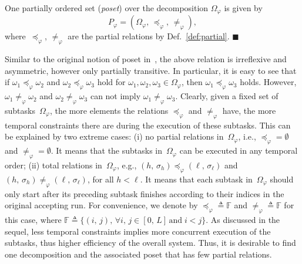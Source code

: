 \begin{definition}\label{def:poset}
One partially ordered set (\emph{poset}) over the decomposition $\Omega_{\varphi}$ is given by
\begin{equation}\label{eq:poset}
P_{\varphi} = (\Omega_{\varphi}, \, \preceq_{\varphi}, \, \neq_{\varphi}),
\end{equation}
where~$\preceq_{\varphi}$, $\neq_{\varphi}$ are the partial relations by
Def.~\ref{def:partial}.
\hfill $\blacksquare$
\end{definition}

Similar to the original notion of poset in~\cite{simovici2008mathematical},
the above relation is irreflexive and asymmetric,
however only partially transitive.
In particular, it is easy to see that
if $\omega_1\preceq_{\varphi} \omega_2$ and $\omega_2\preceq_{\varphi} \omega_3$
hold for $\omega_1,\omega_2,\omega_3\in \Omega_{\varphi}$,
then $\omega_1\preceq_{\varphi}\omega_3$ holds.
However, $\omega_1\neq_{\varphi} \omega_2$ and $\omega_2\neq_{\varphi} \omega_3$
can not imply $\omega_1\neq_{\varphi} \omega_3$.
Clearly, given a fixed set of subtasks~$\Omega_{\varphi}$, the more elements
the relations $\preceq_{\varphi}$ and $\neq_{\varphi}$ have,
the more temporal constraints there are during the execution of these subtasks.
This can be explained by two extreme cases:
(i) no partial relations in~$\Omega_{\varphi}$, i.e.,
$\preceq_{\varphi}=\emptyset$ and $\neq_{\varphi}=\emptyset$.
It means that the subtasks in~$\Omega_{\varphi}$ can be executed in any temporal order;
(ii) total relations in~$\Omega_{\varphi}$,
e.g., $(h,\,\sigma_h) \preceq_{\varphi} (\ell,\,\sigma_\ell)$
and $(h,\,\sigma_h) \neq_{\varphi} (\ell,\,\sigma_\ell)$, for all $h<\ell$.
It means that each subtask in~$\Omega_{\varphi}$ should only start after
its preceding subtask finishes according to their indices in the original accepting run.
For convenience, we denote by $\preceq_{\varphi} \triangleq \mathbb{F}$
and $\neq_{\varphi} \triangleq \mathbb{F}$ for this case,
where $\mathbb{F}\triangleq \{(i,\, j),\, \forall i,\,j\in [0,\, L] \,\text{and}\; i<j\}$.
As discussed in the sequel,
less temporal constraints implies more concurrent execution of the subtasks,
thus higher efficiency of the overall system.
Thus, it is desirable to find one decomposition and the associated poset
that has few partial relations.


